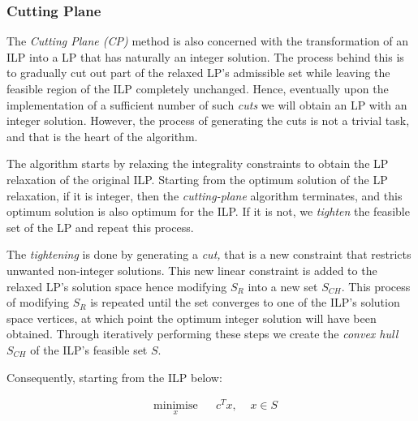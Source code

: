 
\subsubsection*{Cutting Plane}
The \textit{Cutting Plane (CP)} method is also concerned with the transformation of an ILP into a LP that has naturally an integer solution. The process behind this is to gradually cut out part of the relaxed LP's admissible set while leaving the feasible region of the ILP completely unchanged. Hence, eventually upon the implementation of a sufficient number of such \textit{cuts} we will obtain an LP with an integer solution. However, the process of generating the cuts is not a trivial task, and that is the heart of the algorithm. 

\vspace{\baselineskip}
\noindent
The algorithm starts by relaxing the integrality constraints to obtain the LP relaxation of the original ILP. Starting from the optimum solution of the LP relaxation, if it is integer, then the \textit{cutting-plane} algorithm terminates, and this optimum solution is also optimum for the ILP. If it is not, we \textit{tighten} the feasible set of the LP and repeat this process. \par
\vspace{\baselineskip}
\noindent
The \textit{tightening }is done by generating a \textit{cut,} that is a new constraint that restricts unwanted non-integer solutions. This new linear constraint is added to the relaxed LP’s solution space hence modifying $S_{R}$ into a new set $S_{CH}$. This process of modifying $S_{R}$ is repeated until the set converges to one of the ILP’s solution space vertices, at which point the optimum integer solution will have been obtained. Through iteratively performing these steps we create the \textit{convex hull} $S_{CH}$ of the ILP's feasible set $S$.\par

\vspace{\baselineskip}
\noindent
Consequently, starting from the ILP below:

\begin{equation*}
\begin{aligned}
& \underset{x}{\text{minimise}}
& & c^{T}x, \;\;\;\; x \in S \\
\end{aligned}
\end{equation*}

